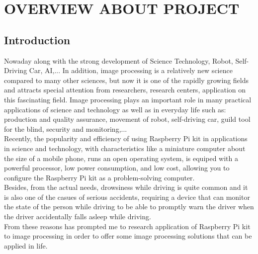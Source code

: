 \chapter{OVERVIEW ABOUT PROJECT}

\renewcommand{\headrulewidth}{0.5pt}
\renewcommand{\footrulewidth}{0.5pt}
\thispagestyle{plain}
\pagestyle{fancy}
\fancyhf{}
\raggedright
{}

\section{Introduction}
    Nowaday along with the strong development of Science Technology, Robot, Self-Driving Car, 
    AI,... In addition, image processing is a relatively new science compared to many other sciences, but now 
    it is one of the rapidly growing fields and attracts special attention from researchers, research centers, 
    application on this fascinating field. Image processing plays an important role in many practical applications 
    of science and technology as well as in everyday life such as: production and quality assurance, movement of robot, 
    self-driving car, guild tool for the blind, security and monitoring,... \\ 
    \vspace{3mm}
    Recently, the popularity and efficiency of using Raspberry Pi kit in applications in science and technology, 
    with characteristics like a miniature computer about the size of a mobile phone, runs an open operating system, 
    is equiped with a powerful processor, low power consumption, and low cost, allowing you to configure the Raspberry 
    Pi kit as a problem-solving computer. \\ 
    \vspace{3mm}
    Besides, from the actual needs, drowsiness while driving is quite common and it is also one of the casues of serious 
    accidents, requiring a device that can monitor the state of the person while driving to be able to promptly 
    warn the driver when the driver accidentally falls asleep while driving. \\ 
    \vspace{3mm}
    From these reasons has prompted me to research application of Raspberry Pi kit to image processing in order to offer 
    some image processing solutions that can be applied in life.

